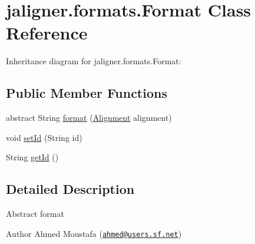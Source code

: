 \hypertarget{classjaligner_1_1formats_1_1_format}{\section{jaligner.\+formats.\+Format Class Reference}
\label{classjaligner_1_1formats_1_1_format}
}


Inheritance diagram for jaligner.\+formats.\+Format\+:
\subsection*{Public Member Functions}
\begin{DoxyCompactItemize}
\item 
abstract String \hyperlink{classjaligner_1_1formats_1_1_format_a9dcc9a47230c1226c818e4e3c39e0743}{format} (\hyperlink{classjaligner_1_1_alignment}{Alignment} alignment)
\item 
void \hyperlink{classjaligner_1_1formats_1_1_format_a473fd596efc8f218f904002249e7d2cc}{set\+Id} (String id)
\item 
String \hyperlink{classjaligner_1_1formats_1_1_format_aa048f21b9987629497d836c399da6747}{get\+Id} ()
\end{DoxyCompactItemize}


\subsection{Detailed Description}
Abstract format

\begin{DoxyAuthor}{Author}
Ahmed Moustafa (\href{mailto:ahmed@users.sf.net}{\tt ahmed@users.\+sf.\+net}) 
\end{DoxyAuthor}


